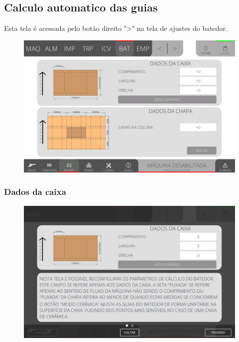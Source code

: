 \newpage
\thispagestyle{fancy}
\vspace*{40 pt}
\subsection{Calculo automatico das guias} \label{sec:telaCalculoAutomaticoGuias}
Esta tela é acessada pelo botão direito "\textgreater" na tela de ajustes do batedor.
\vspace*{\fill}
\begin{figure}[h]
    \centering
    \includegraphics[width=480 px,height=300 px]{src/imagesICV/07-scout/settings/e-Tela-Principal-2.png}
\end{figure}
\vspace*{\fill}


\newpage
\thispagestyle{fancy}
\vspace*{40 pt}
\subsubsection{\small{Dados da caixa}} \label{sec:telaCalculoAutomaticoGuiasDadosCaixa}
\vspace*{\fill}
\begin{figure}[h]
    \centering
    \includegraphics[width=576 px,height=360 px]{src/imagesICV/07-scout/settings/e-6.png}
\end{figure}
\vspace*{\fill}

